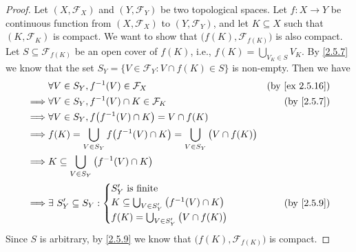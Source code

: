 \begin{proof}
  Let \((X, \mathcal{F}_X)\) and \((Y, \mathcal{F}_Y)\) be two topological spaces.
  Let \(f : X \to Y\) be continuous function from \((X, \mathcal{F}_X)\) to \((Y, \mathcal{F}_Y)\), and let \(K \subseteq X\) such that \((K, \mathcal{F}_K)\) is compact.
  We want to show that \(\big(f(K), \mathcal{F}_{f(K)}\big)\) is also compact.
  Let \(S \subseteq \mathcal{F}_{f(K)}\) be an open cover of \(f(K)\), i.e., \(f(K) = \bigcup_{V_K \in S} V_K\).
  By \cref{2.5.7} we know that the set \(S_Y = \{V \in \mathcal{F}_Y : V \cap f(K) \in S\}\) is non-empty.
  Then we have
  \begin{align*}
             & \forall V \in S_Y, f^{-1}(V) \in \mathcal{F}_X                                                     & \text{(by \cref{ex 2.5.16})} \\
    \implies & \forall V \in S_Y, f^{-1}(V) \cap K \in \mathcal{F}_K                                              & \text{(by \cref{2.5.7})}     \\
    \implies & \forall V \in S_Y, f\big(f^{-1}(V) \cap K\big) = V \cap f(K)                                                                      \\
    \implies & f(K) = \bigcup_{V \in S_Y} f\big(f^{-1}(V) \cap K\big) = \bigcup_{V \in S_Y} \big(V \cap f(K)\big)                                \\
    \implies & K \subseteq \bigcup_{V \in S_Y} \big(f^{-1}(V) \cap K\big)                                                                        \\
    \implies & \exists\ S_Y' \subseteq S_Y : \begin{cases}
                                               S_Y' \text{ is finite}                                      \\
                                               K \subseteq \bigcup_{V \in S_Y'} \big(f^{-1}(V) \cap K\big) \\
                                               f(K) = \bigcup_{V \in S_Y'} \big(V \cap f(K)\big)
                                             \end{cases}                                     & \text{(by \cref{2.5.9})}                          \\
  \end{align*}
  Since \(S\) is arbitrary, by \cref{2.5.9} we know that \(\big(f(K), \mathcal{F}_{f(K)}\big)\) is compact.


\end{proof}
